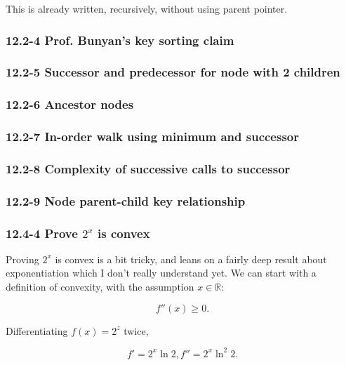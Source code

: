 \documentclass{article}
\begin{document}
This is already written, recursively, without using parent pointer.


\subsubsection{12.2-4 Prof. Bunyan's key sorting claim}

\subsubsection{12.2-5 Successor and predecessor for node with 2 children}

\subsubsection{12.2-6 Ancestor nodes}

\subsubsection{12.2-7 In-order walk using minimum and successor}

\subsubsection{12.2-8 Complexity of successive calls to successor}

\subsubsection{12.2-9 Node parent-child key relationship}


\subsubsection{12.4-4 Prove $2^x$ is convex}

Proving $2^x$ is convex is a bit tricky, and leans on a fairly deep result about
exponentiation which I don't really understand yet. We can start with a definition
of convexity, with the assumption $x\in\mathbb{R}$:

\begin{equation}
  f''(x) \geq 0.
\end{equation}

Differentiating $f(x) = 2^z$ twice,

\begin{equation}
  f' = 2^x \ln 2, f'' = 2^x\ln^2 2.
\end{equation}
\end{document}
